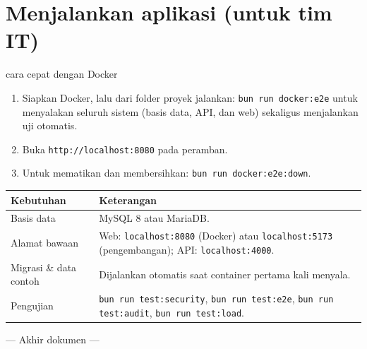 \documentclass[11pt,a4paper]{article}
\newcommand{\code}[1]{\texttt{\small #1}}
\begin{document}
\section{Menjalankan aplikasi (untuk tim IT)}

\begin{itembox}{cara cepat dengan Docker}
\begin{enumerate}[leftmargin=1.4em,itemsep=0.25em]
  \item Siapkan Docker, lalu dari folder proyek jalankan:
        \code{bun run docker:e2e} untuk menyalakan seluruh sistem (basis data,
        API, dan web) sekaligus menjalankan uji otomatis.
  \item Buka \code{http://localhost:8080} pada peramban.
  \item Untuk mematikan dan membersihkan: \code{bun run docker:e2e:down}.
\end{enumerate}
\end{itembox}

\begin{tabularx}{\textwidth}{@{}L{4.6cm}Y@{}}
  \toprule
  \textbf{Kebutuhan} & \textbf{Keterangan} \\
  \midrule
  Basis data & MySQL 8 atau MariaDB. \\
  Alamat bawaan & Web: \code{localhost:8080} (Docker) atau \code{localhost:5173} (pengembangan); API: \code{localhost:4000}. \\
  Migrasi \& data contoh & Dijalankan otomatis saat container pertama kali menyala. \\
  Pengujian & \code{bun run test:security}, \code{bun run test:e2e}, \code{bun run test:audit}, \code{bun run test:load}. \\
  \bottomrule
\end{tabularx}

\vfill
\begin{center}
  \small\textcolor{ink}{--- Akhir dokumen ---}
\end{center}
\end{document}

